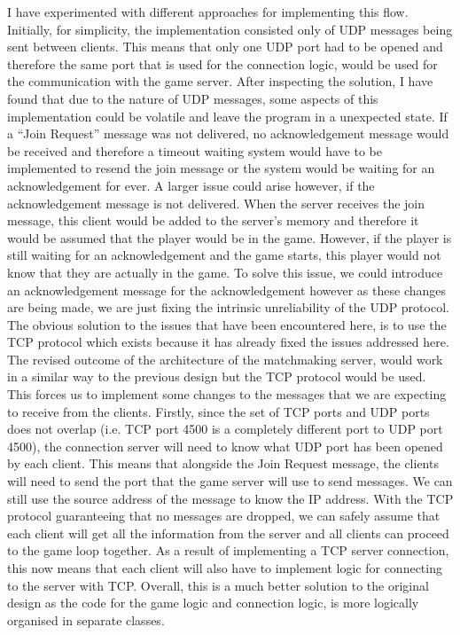 I have experimented with different approaches for implementing this flow. Initially, for simplicity, the implementation consisted only of UDP messages being sent between clients. This means that only one UDP port had to be opened and therefore the same port that is used for the connection logic, would be used for the communication with the game server. After inspecting the solution, I have found that due to the nature of UDP messages, some aspects of this implementation could be volatile and leave the program in a unexpected state. If a ``Join Request'' message was not delivered, no acknowledgement message would be received and therefore a timeout waiting system would have to be implemented to resend the join message or the system would be waiting for an acknowledgement for ever. A larger issue could arise however, if the acknowledgement message is not delivered. When the server receives the join message, this client would be added to the server's memory and therefore it would be assumed that the player would be in the game. However, if the player is still waiting for an acknowledgement and the game starts, this player would not know that they are actually in the game. To solve this issue, we could introduce an acknowledgement message for the acknowledgement however as these changes are being made, we are just fixing the intrinsic unreliability of the UDP protocol.
The obvious solution to the issues that have been encountered here, is to use the TCP protocol which exists because it has already fixed the issues addressed here.
The revised outcome of the architecture of the matchmaking server, would work in a similar way to the previous design but the TCP protocol would be used. This forces us to implement some changes to the messages that we are expecting to receive from the clients. Firstly, since the set of TCP ports and UDP ports does not overlap (i.e. TCP port 4500 is a completely different port to UDP port 4500), the connection server will need to know what UDP port has been opened by each client. This means that alongside the Join Request message, the clients will need to send the port that the game server will use to send messages. We can still use the source address of the message to know the IP address. With the TCP protocol guaranteeing that no messages are dropped, we can safely assume that each client will get all the information from the server and all clients can proceed to the game loop together. As a result of implementing a TCP server connection, this now means that each client will also have to implement logic for connecting to the server with TCP.
Overall, this is a much better solution to the original design as the code for the game logic and connection logic, is more logically organised in separate classes.



